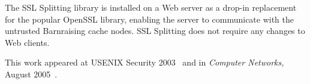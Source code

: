 \documentclass[margin,line,11pt]{resume}
\begin{document}
\begin{resume}
The SSL Splitting library is installed on a Web server as a drop-in replacement
for the popular OpenSSL library, enabling the server to communicate with the
untrusted Barnraising cache nodes.  SSL Splitting does not require any changes
to Web clients.

This work appeared at USENIX Security 2003~\cite{ssl-splitting:usenixsecurity03}
and in \textit{Computer Networks,\/} August 2005~\cite{ssl-splitting:compnet05}.

\end{resume}
\end{document}
